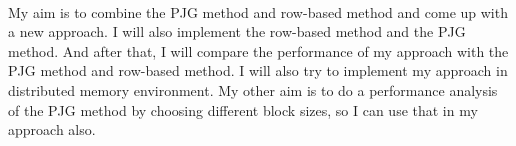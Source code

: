 \documentclass[11pt]{article}       %
\begin{document}
\\My aim is to combine the PJG method and row-based method and come up with a new approach. I will also implement the row-based method and the PJG method. And after that, I will compare the performance of my approach with the PJG method and row-based method. I will also try to implement my approach in distributed memory environment. My other aim is to do a performance analysis of the PJG method by choosing different block sizes, so I can use that in my approach also. 


\end{document}
